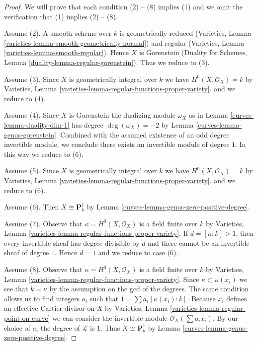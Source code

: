 \begin{proof}

We will prove that each condition (2) -- (8) implies (1) and we omit
the verification that (1) implies (2) -- (8).

\medskip\noindent
Assume (2). A smooth scheme over $k$ is geometrically reduced
(Varieties, Lemma \ref{varieties-lemma-smooth-geometrically-normal})
and regular (Varieties, Lemma \ref{varieties-lemma-smooth-regular}).
Hence $X$ is Gorenstein (Duality for Schemes, Lemma
\ref{duality-lemma-regular-gorenstein}).
Thus we reduce to (3).

\medskip\noindent
Assume (3). Since $X$ is geometrically integral over $k$ we have
$H^0(X, \mathcal{O}_X) = k$ by
Varieties, Lemma \ref{varieties-lemma-regular-functions-proper-variety}.
and we reduce to (4).

\medskip\noindent
Assume (4). Since $X$ is Gorenstein the dualizing module
$\omega_X$ as in Lemma \ref{curves-lemma-duality-dim-1} has degree
$\deg(\omega_X) = -2$ by Lemma \ref{curves-lemma-genus-gorenstein}.
Combined with the assumed existence of an odd degree invertible
module, we conclude there exists an invertible module of degree $1$.
In this way we reduce to (6).

\medskip\noindent
Assume (5). Since $X$ is geometrically integral over $k$ we have
$H^0(X, \mathcal{O}_X) = k$ by
Varieties, Lemma \ref{varieties-lemma-regular-functions-proper-variety}.
and we reduce to (6).

\medskip\noindent
Assume (6). Then $X \cong \mathbf{P}^1_k$ by
Lemma \ref{curves-lemma-genus-zero-positive-degree}.

\medskip\noindent
Assume (7). Observe that $\kappa = H^0(X, \mathcal{O}_X)$ is a field
finite over $k$ by
Varieties, Lemma \ref{varieties-lemma-regular-functions-proper-variety}.
If $d = [\kappa : k] > 1$, then every invertible sheaf has degree
divisible by $d$ and there cannot be an invertible sheaf of degree $1$.
Hence $d = 1$ and we reduce to case (6).

\medskip\noindent
Assume (8). Observe that $\kappa = H^0(X, \mathcal{O}_X)$ is a field
finite over $k$ by
Varieties, Lemma \ref{varieties-lemma-regular-functions-proper-variety}.
Since $\kappa \subset \kappa(x_i)$ we see that $k = \kappa$
by the assumption on the gcd of the degrees. The same condition
allows us to find integers $a_i$ such that
$1 = \sum a_i[\kappa(x_i) : k]$. Because $x_i$ defines an
effective Cartier divisor on $X$ by
Varieties, Lemma \ref{varieties-lemma-regular-point-on-curve}
we can consider the invertible module $\mathcal{O}_X(\sum a_i x_i)$.
By our choice of $a_i$ the degree of $\mathcal{L}$ is $1$.
Thus $X \cong \mathbf{P}^1_k$ by Lemma \ref{curves-lemma-genus-zero-positive-degree}.
\end{proof}

